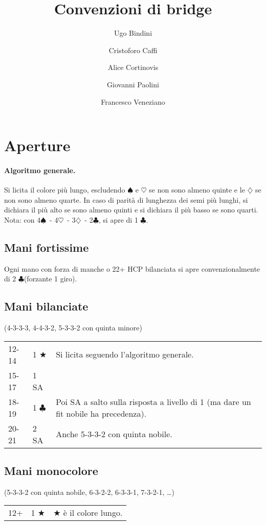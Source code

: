 \documentclass[a4paper,10pt]{article}
\title{Convenzioni di bridge}
\author{Ugo Bindini \and Cristoforo Caffi \and Alice Cortinovis \and Giovanni Paolini \and Francesco Veneziano}
\renewcommand{\c}{$\clubsuit$\xspace}
\renewcommand{\d}{$\diamondsuit$\xspace}
\newcommand{\h}{$\heartsuit$\xspace}
\newcommand{\s}{$\spadesuit$\xspace}
\renewcommand{\j}{$\bigstar$\xspace}
\newcommand{\sa}{SA\xspace}
\newcommand{\smallspace}{\vskip0.3cm}
\newenvironment{threecol}
  {\smallspace\noindent\begin{tabular}{l l p{0.78\textwidth}}}
  {\end{tabular}\smallspace}
\begin{document}
\maketitle

\tableofcontents

\pagebreak
\section{Aperture}

\paragraph{Algoritmo generale.}
Si licita il colore più lungo, escludendo \s e \h se non sono almeno quinte e le \d se non sono almeno quarte.
In caso di parità di lunghezza dei semi più lunghi, si dichiara il più alto se sono almeno quinti e si dichiara il più basso se sono quarti.
Nota: con 4\s\ - 4\h\ - 3\d\ - 2\c, si apre di 1 \c.

\subsection{Mani fortissime}

Ogni mano con forza di manche o 22+ HCP bilanciata si apre convenzionalmente di 2 \c (forzante 1 giro).

\subsection{Mani bilanciate}
(4-3-3-3, 4-4-3-2, 5-3-3-2 con quinta minore)
\smallspace

\begin{threecol}
 12-14 & 1 \j & Si licita seguendo l'algoritmo generale. \\
 15-17 & 1 \sa & \\
 18-19 & 1 \c & Poi \sa a salto sulla risposta a livello di 1 (ma dare un fit nobile ha precedenza). \\
 20-21 & 2 \sa & Anche 5-3-3-2 con quinta nobile.
\end{threecol}


\subsection{Mani monocolore}
(5-3-3-2 con quinta nobile, 6-3-2-2, 6-3-3-1, 7-3-2-1, \dots)

\begin{threecol}
 12+ & 1 \j & \j è il colore lungo.
\end{threecol}
\end{document}
